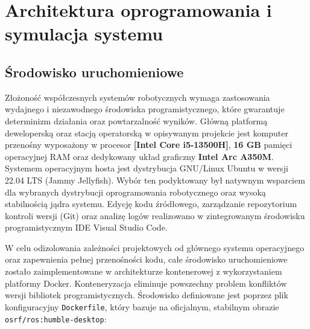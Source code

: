 \documentclass[a4paper,twoside,12pt]{book}
\begin{document}


\chapter{Architektura oprogramowania i symulacja systemu}

\section{Środowisko uruchomieniowe}
Złożoność współczesnych systemów robotycznych wymaga zastosowania wydajnego i niezawodnego środowiska programistycznego, które gwarantuje determinizm działania oraz powtarzalność wyników. Główną platformą deweloperską oraz stacją operatorską w opisywanym projekcie jest komputer przenośny wyposażony w procesor \textbf{[Intel Core i5-13500H]}, \textbf{16 GB} pamięci operacyjnej RAM oraz dedykowany układ graficzny \textbf{Intel Arc A350M}. Systemem operacyjnym hosta jest dystrybucja GNU/Linux Ubuntu w wersji 22.04 LTS (Jammy Jellyfish). Wybór ten podyktowany był natywnym wsparciem dla wybranych dystrybucji oprogramowania robotycznego oraz wysoką stabilnością jądra systemu. Edycję kodu źródłowego, zarządzanie repozytorium kontroli wersji (Git) oraz analizę logów realizowano w zintegrowanym środowisku programistycznym IDE Visual Studio Code.

W celu odizolowania zależności projektowych od głównego systemu operacyjnego oraz zapewnienia pełnej przenośności kodu, całe środowisko uruchomieniowe zostało zaimplementowane w architekturze kontenerowej z wykorzystaniem platformy Docker. Konteneryzacja eliminuje powszechny problem konfliktów wersji bibliotek programistycznych. Środowisko definiowane jest poprzez plik konfiguracyjny \texttt{Dockerfile}, który bazuje na oficjalnym, stabilnym obrazie \texttt{osrf/ros:humble-desktop}:
\end{document}
